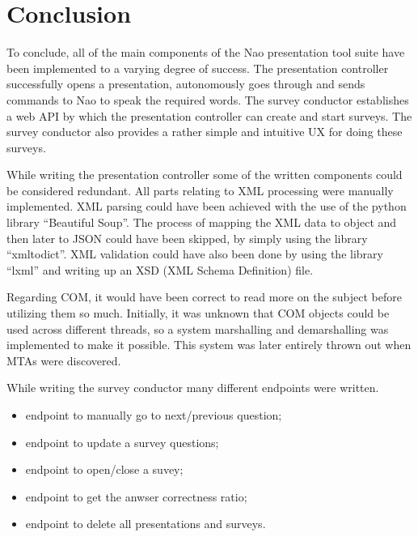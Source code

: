 \documentclass[12pt, fleqn, a4paper]{article}
\begin{document}
\section*{\centering Conclusion}
To conclude, all of the main components of the Nao presentation tool suite have been implemented to a varying degree of success. The presentation controller successfully opens a presentation, autonomously goes through and sends commands to Nao to speak the required words.
The survey conductor establishes a web API by which the presentation controller can create and start surveys. The survey conductor also provides a rather simple and intuitive UX for doing these surveys.
\par
While writing the presentation controller some of the written components could be considered redundant. All parts relating to XML processing were manually implemented. XML parsing could have been achieved with the use of the python library \enquote{Beautiful Soup}.
The process of mapping the XML data to object and then later to JSON could have been skipped, by simply using the library \enquote{xmltodict}. XML validation could have also been done by using the library \enquote{lxml} and writing up an XSD (XML Schema Definition) file.\par
Regarding COM, it would have been correct to read more on the subject before utilizing them so much. Initially, it was unknown that COM objects could be used across different threads, so a system marshalling and demarshalling was implemented to make it possible. This system was later entirely thrown out when MTAs were discovered.\par
While writing the survey conductor many different endpoints were written.
\begin{itemize}
	\item endpoint to manually go to next/previous question;
	\item endpoint to update a survey questions;
	\item endpoint to open/close a suvey;
	\item endpoint to get the anwser correctness ratio;
	\item endpoint to delete all presentations and surveys.
\end{itemize}
\end{document}
